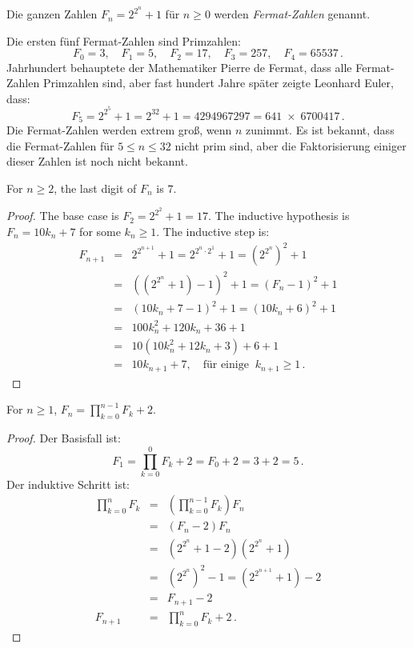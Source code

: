 \begin{definition}
Die ganzen Zahlen $F_n=2^{2^{n}}+1$ für $n\geq 0$ werden \emph{Fermat-Zahlen} genannt.
\end{definition}

Die ersten fünf Fermat-Zahlen sind Primzahlen:
\[
F_0=3,\quad F_1=5,\quad F_2=17,\quad F_3=257,\quad F_4=65537\,.
\]
Jahrhundert behauptete der Mathematiker Pierre de Fermat, dass alle Fermat-Zahlen Primzahlen sind, aber fast hundert Jahre später zeigte Leonhard Euler, dass:
\[F_5=2^{2^5}+1 = 2^{32}+1 = 4294967297 = 641 \;\times\; 6700417\,.\]
Die Fermat-Zahlen werden extrem groß, wenn $n$ zunimmt. Es ist bekannt, dass die Fermat-Zahlen für $5\leq n \leq 32$ nicht prim sind, aber die Faktorisierung einiger dieser Zahlen ist noch nicht bekannt.

\begin{theorem}
For $n\geq 2$, the last digit of $F_n$ is $7$.
\end{theorem}
\begin{proof}
The base case is $F_2=2^{2^2}+1=17$.
The inductive hypothesis is $F_n=10k_n+7$ for some $k_n\geq 1$. The inductive step is:
\begin{eqnarray*}
F_{n+1}&=&2^{2^{n+1}}+1=2^{2^{n}\cdot 2^1}+1=\left(2^{2^{n}}\right)^2+1\\
&=&\left(\left(2^{2^{n}}+1\right)-1\right)^2+1=(F_n-1)^2+1\\
&=&(10k_n+7-1)^2+1=(10k_n+6)^2+1\\
&=&100k_n^2+120k_n+36+1\\
&=&10(10k_n^2+12k_n+3)+6+1\\
&=&10k_{n+1}+7,\quad \textrm{für einige} \;\;k_{n+1}\geq 1\,.
\end{eqnarray*}
\end{proof}


\begin{theorem}
For $n\geq 1$, $\displaystyle F_n = \prod_{k=0}^{n-1} F_k + 2$.
\end{theorem}
\begin{proof}
Der Basisfall ist:
\[
F_1=\prod_{k=0}^{0} F_k + 2=F_0+2=3+2=5\,.
\]
Der induktive Schritt ist:
\begin{eqnarray*}
\prod_{k=0}^{n}F_k&=&\left(\prod_{k=0}^{n-1}F_k\right) F_n \\
&=& (F_n-2)F_n\\
&=& \left(2^{2^n}+1-2\right)\left(2^{2^n}+1\right)\\
&=& \left(2^{2^{n}}\right)^2-1= \left(2^{2^{n+1}}+1\right)-2\\
&=&F_{n+1}-2\\
F_{n+1}&=&\prod_{k=0}^{n}F_k + 2\,.
\end{eqnarray*}
\end{proof}


